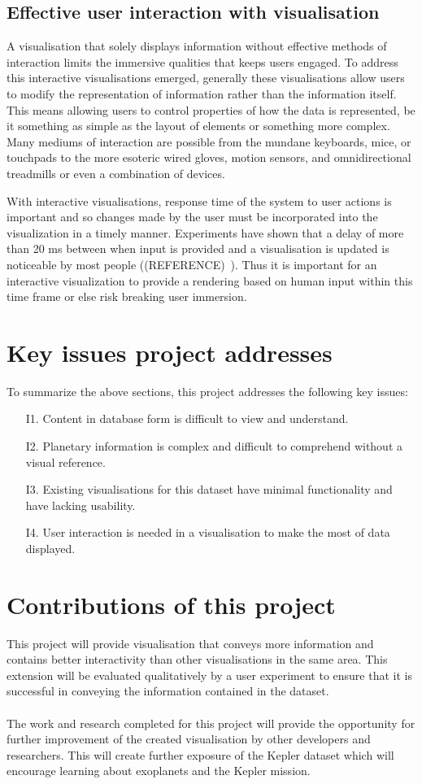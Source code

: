 \subsection{Effective user interaction with visualisation}
A visualisation that solely displays information without effective methods of interaction limits the immersive qualities that keeps users engaged. To address this interactive visualisations emerged, generally these visualisations allow users to modify the representation of information rather than the information itself. This means allowing users to control properties of how the data is represented, be it something as simple as the layout of elements or something more complex. Many mediums of interaction are possible from the mundane keyboards, mice, or touchpads to the more esoteric wired gloves, motion sensors, and omnidirectional treadmills or even a combination of devices.

With interactive visualisations, response time of the system to user actions is important and so changes made by the user must be incorporated into the visualization in a timely manner. Experiments have shown that a delay of more than 20 ms between when input is provided and a visualisation is updated is noticeable by most people ((REFERENCE)~). Thus it is important for an interactive visualization to provide a rendering based on human input within this time frame or else risk breaking user immersion.

\section{Key issues project addresses}
To summarize the above sections, this project addresses the following key issues:
\begin{enumerate}
 \item[I1.] Content in database form is difficult to view and understand.
 \item[I2.] Planetary information is complex and difficult to comprehend without a visual reference.
 \item[I3.] Existing visualisations for this dataset have minimal functionality and have lacking usability.
 \item[I4.] User interaction is needed in a visualisation to make the most of data displayed.
\end{enumerate}

\section{Contributions of this project}
This project will provide visualisation that conveys more information and contains better interactivity than other visualisations in the same area. This extension will be evaluated qualitatively by a user experiment to ensure that it is successful in conveying the information contained in the dataset.
\\\\
The work and research completed for this project will provide the opportunity for further improvement of the created visualisation by other developers and researchers. This will create further exposure of the Kepler dataset which will encourage learning about exoplanets and the Kepler mission.
